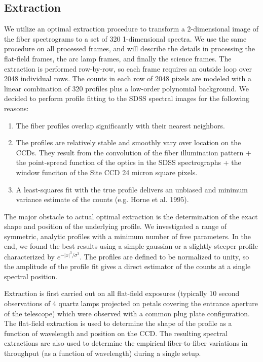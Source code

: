 

\subsection{Extraction}

We utilize an optimal extraction procedure to transform a 2-dimensional image of
the fiber spectrograms to a set of 320 1-dimensional spectra.  We use the same procedure
on all processed frames, and will describe the details in processing the flat-field frames, the
arc lamp frames, and finally the science frames.  
The extraction is performed row-by-row, so each frame requires an outside loop over 2048 individual rows.
The counts in each row of 2048 pixels are modeled with a linear combination of 320 profiles plus a low-order
polynomial background.  We decided to perform profile fitting to the SDSS spectral images 
for the following reasons:  

\begin{enumerate}

\item{The fiber profiles overlap significantly with their nearest neighbors.}

\item{The profiles are relatively stable and smoothly vary over location on the CCDs.  
They result from the convolution of the fiber illumination pattern + the point-spread function
of the optics in the SDSS spectrographs + the window funciton of the Site CCD 24 micron square pixels. }

\item{A least-squares fit with the true profile delivers an unbiased and minimum variance estimate of the counts
(e.g. Horne et al. 1995).}

\end{enumerate}

The major obstacle to actual optimal extraction is the determination of the exact shape and position 
of the underlying profile.  We investigated a range of symmetric, analytic profiles with a 
minimum number of free parameters.  In the end, we found the best results using a simple gaussian 
or a slightly steeper profile characterized by $e^{-|x|^3/\sigma^3}$.  The profiles
are defined to be normalized to unity, so the amplitude of the profile fit gives a direct estimator
of the counts at a single spectral position. 

Extraction is first carried out on all flat-field exposures (typically 10 second observations of
4 quartz lamps projected on petals covering the entrance aperture of the telescope) which were observed
with a common plug plate configuration.  The flat-field extraction is used to determine the shape of
the profile as a function of wavelength and position on the CCD.  The resulting spectral extractions are also used to 
determine the empirical fiber-to-fiber variations in throughput (as a function of wavelength) 
during a single setup.   

